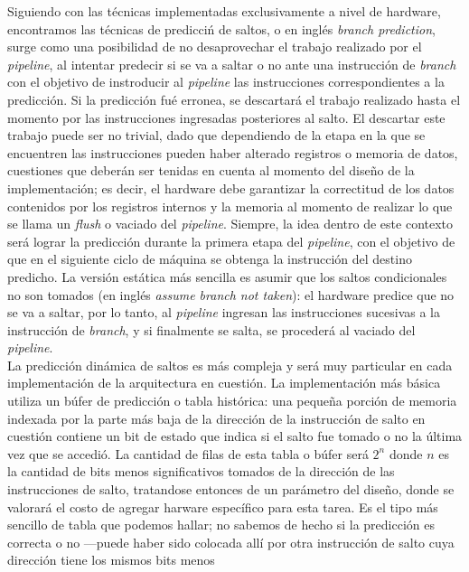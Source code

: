 Siguiendo con las técnicas implementadas exclusivamente a nivel de hardware, 
encontramos las técnicas de predicciń de saltos, o en inglés \emph{branch 
prediction}, surge como una posibilidad de no desaprovechar el trabajo realizado 
por el \emph{pipeline}, al intentar predecir si se va a saltar o no ante una 
instrucción de \emph{branch} con el objetivo de instroducir al \emph{pipeline} 
las instrucciones correspondientes a la predicción. Si la predicción fué 
erronea, se descartará el trabajo realizado hasta el momento por las 
instrucciones ingresadas posteriores al salto. El descartar este trabajo puede 
ser no trivial, dado que dependiendo de la etapa en la que se encuentren las 
instrucciones pueden haber alterado registros o memoria de datos, cuestiones que 
deberán ser tenidas en cuenta al momento del diseño de la implementación; es 
decir, el hardware debe garantizar la correctitud de los datos contenidos por 
los registros internos y la memoria al momento de realizar lo que se llama un 
\emph{flush} o vaciado del \emph{pipeline}. Siempre, la idea dentro de este 
contexto será lograr la predicción durante la primera etapa del 
\emph{pipeline}, con el objetivo de que en el siguiente ciclo de máquina se 
obtenga la instrucción del destino predicho. La versión estática más sencilla es 
asumir que los saltos condicionales no son tomados (en inglés \emph{assume 
branch not taken}): el hardware predice que no se va a saltar, por lo tanto, al 
\emph{pipeline} ingresan las instrucciones sucesivas a la instrucción de 
\emph{branch}, y si finalmente se salta, se procederá al vaciado del 
\emph{pipeline}.\\
La predicción dinámica de saltos es más compleja y será muy particular en cada 
implementación de la arquitectura en cuestión. La implementación más básica 
utiliza un búfer de predicción o tabla histórica: una pequeña porción de 
memoria indexada por la parte más baja de la dirección de la instrucción de 
salto en cuestión contiene un bit de estado que indica si el salto fue tomado o 
no la última vez que se accedió. La cantidad de filas de esta tabla o 
búfer será $2^n$ donde $n$ es la cantidad de bits menos significativos tomados 
de la dirección de las instrucciones de salto, tratandose entonces de un 
parámetro del diseño, donde se valorará el costo de agregar harware específico 
para esta tarea. Es el tipo más sencillo de tabla que podemos hallar; no sabemos 
de hecho si la predicción es correcta o no ---puede haber sido colocada allí por 
otra instrucción de salto cuya dirección tiene los mismos bits menos 
